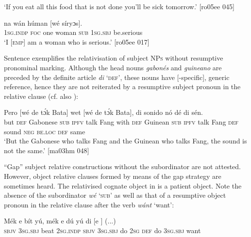 \glt ‘If you eat all this food that is not done you’ll be sick tomorrow.’ [ro05ee 045]
\z


\ea%
    \label{ex:key:1431}
\gll
{}    na  wán    húman  [wé     síryɔs].\\
\textsc{1sg.indp}  \textsc{foc}  one    woman   \textsc{sub}  \textsc{1sg.sbj}  be.serious\\
\glt ‘I \textsc{[emp]} am a woman who is serious.’  [ro05ee 017]
\z

Sentence  exemplifies the relativisation of subject \textsc{NPs} without resumptive pronominal marking. Although the head nouns \textit{gabonés} and \textit{guineano} are preceded by the definite article \textit{di} ‘\textsc{def’}, these nouns have [-specific], generic reference, hence they are not reiterated by a resumptive subject pronoun in the relative clause (cf. also ): 


\ea%
    \label{ex:key:1432}
    \gll Pero          [wé  de  tɔ́k  Bata]  wet        
[wé  de  tɔ́k   Bata],  di  sonido  nó  dé    di  sén.\\
but    \textsc{def}  Gabonese   \textsc{sub}  \textsc{ipfv}  talk  Fang  with    \textsc{def}  Guinean    
 \textsc{sub}  \textsc{ipfv}  talk Fang    \textsc{def}  sound  \textsc{neg}  \textsc{be.loc}  \textsc{def}  same\\

\glt ‘But the Gabonese who talks Fang and the Guinean who talks Fang, 
the sound is not the same.’ [ma03hm 048]
\z

“Gap” subject relative constructions without the subordinator are not attested. However, object relative clauses formed by means of the gap strategy are sometimes heard. The relativised cognate object in  is a patient object. Note the absence of the subordinator \textit{wé} ‘\textsc{sub}’ as well as that of a resumptive object pronoun in the relative clause after the verb \textit{wánt} ‘want’:


\ea%
    \label{ex:key:1433}
    \gll Mék    e    bít    yú,    mék    e    dú  yú  di  
[e    ]  (...)\\
\textsc{sbjv}    \textsc{3sg.sbj}  beat    \textsc{2sg.indp}  \textsc{sbjv}    \textsc{3sg.sbj}  do  \textsc{2sg}  \textsc{def}  do
\textsc{3sg.sbj}  want \\

